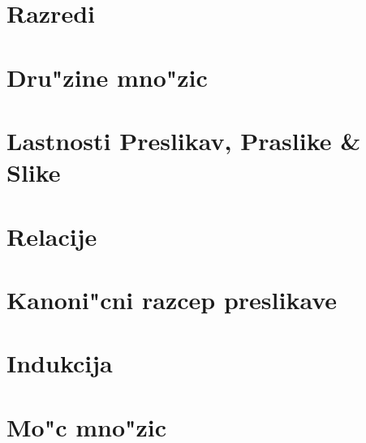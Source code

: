 \documentclass[a4paper, 12pt]{article}
\begin{document}
	\section{Razredi}
	
	
	\section{Dru"zine mno"zic}
	
	
	\section{Lastnosti Preslikav, Praslike \& Slike}
	
	
	\section{Relacije}
	
	
	\section{Kanoni"cni razcep preslikave}
	
	
	\section{Indukcija}
	
	
	\section{Mo"c mno"zic}
	
\end{document}
